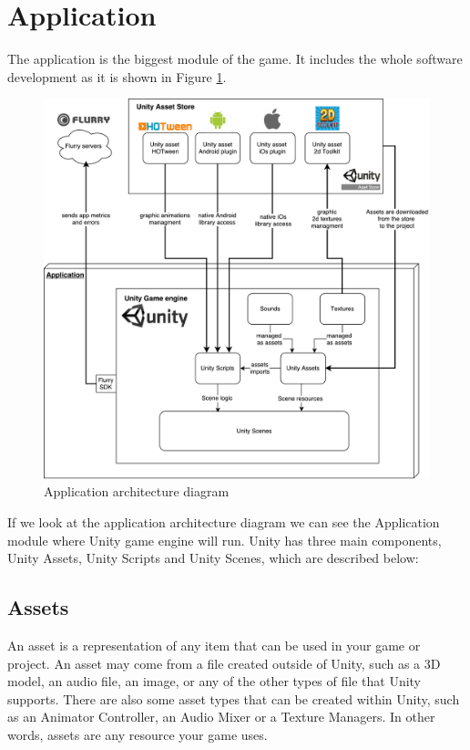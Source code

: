 \newpage
\section{Application}
\label{sec:application}
The application is the biggest module of the game. It includes the whole software development as it is shown in Figure \ref{fig:applicationarchitecture}.

\begin{figure}[ht!]
	\centering
	\includegraphics[width=400pt]{graphics/architecture/Application_architecture.pdf}
	\caption{Application architecture diagram}
	\label{fig:applicationarchitecture}
\end{figure}

If we look at the application architecture diagram we can see the Application module where Unity game engine will run. Unity has three main components, Unity Assets, Unity Scripts and Unity Scenes, which are described below:

\subsection{Assets}
An asset is a representation of any item that can be used in your game or project. An asset may come from a file created outside of Unity, such as a 3D model, an audio file, an image, or any of the other types of file that Unity supports. There are also some asset types that can be created within Unity, such as an Animator Controller, an Audio Mixer or a Texture Managers. In other words, assets are any resource your game uses.

